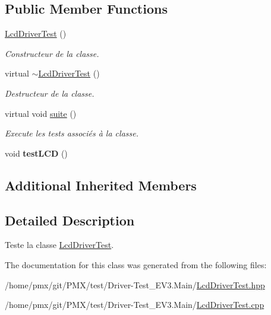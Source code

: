 \subsection*{Public Member Functions}
\begin{DoxyCompactItemize}
\item 
\mbox{\label{classtest_1_1LcdDriverTest_a18600101aac0ad487c7633b7e504f930}} 
\hyperlink{classtest_1_1LcdDriverTest_a18600101aac0ad487c7633b7e504f930}{Lcd\+Driver\+Test} ()
\begin{DoxyCompactList}\small\item\em Constructeur de la classe. \end{DoxyCompactList}\item 
\mbox{\label{classtest_1_1LcdDriverTest_a3b45cd6cbc02a2fb3f45f2eef5e5e0c4}} 
virtual \hyperlink{classtest_1_1LcdDriverTest_a3b45cd6cbc02a2fb3f45f2eef5e5e0c4}{$\sim$\+Lcd\+Driver\+Test} ()
\begin{DoxyCompactList}\small\item\em Destructeur de la classe. \end{DoxyCompactList}\item 
\mbox{\label{classtest_1_1LcdDriverTest_ad4865603b8650e42a906cf392d901e0c}} 
virtual void \hyperlink{classtest_1_1LcdDriverTest_ad4865603b8650e42a906cf392d901e0c}{suite} ()
\begin{DoxyCompactList}\small\item\em Execute les tests associés à la classe. \end{DoxyCompactList}\item 
\mbox{\label{classtest_1_1LcdDriverTest_ab1988e99c2a7aab84f461d33731e2284}} 
void {\bfseries test\+L\+CD} ()
\end{DoxyCompactItemize}
\subsection*{Additional Inherited Members}


\subsection{Detailed Description}
Teste la classe \hyperlink{classtest_1_1LcdDriverTest}{Lcd\+Driver\+Test}. 

The documentation for this class was generated from the following files\+:\begin{DoxyCompactItemize}
\item 
/home/pmx/git/\+P\+M\+X/test/\+Driver-\/\+Test\+\_\+\+E\+V3.\+Main/\hyperlink{LcdDriverTest_8hpp}{Lcd\+Driver\+Test.\+hpp}\item 
/home/pmx/git/\+P\+M\+X/test/\+Driver-\/\+Test\+\_\+\+E\+V3.\+Main/\hyperlink{LcdDriverTest_8cpp}{Lcd\+Driver\+Test.\+cpp}\end{DoxyCompactItemize}
